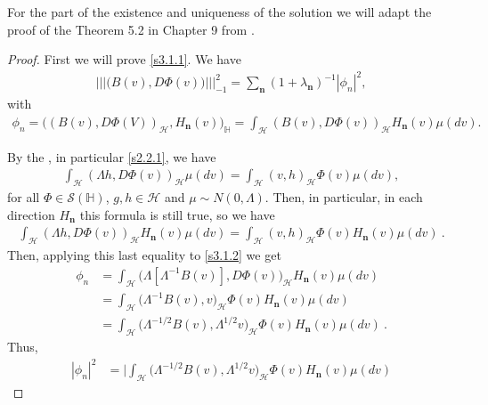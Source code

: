 \documentclass[review, onefignum, onetabnum]{siamart171218}
\begin{document}
    For the part of the existence and uniqueness of the solution we will adapt
    the proof of the Theorem 5.2 in Chapter 9 from \cite{liu}.
\begin{proof}
    First we will prove \eqref{s3.1.1}. We have
    \begin{align*}
        ||| \big(B(v),D\Phi(v) \big) |||_{-1}^2 =\sum_{\mathbf{n}}
        (1+\lambda_{\mathbf{n}})^{-1}|\phi_n|^2 ,
    \end{align*}
    with
    \begin{align}
        \phi_n=
        \Big(
            (B(v),D\Phi(V))_{\mathcal{H}}, H_{\mathbf{n}}(v)
        \Big)_{\mathbb{H}}
        =\int_{\mathcal{H}} (B(v),D\Phi(v))_{\mathcal{H}} H_{\mathbf{n}}(v)
        \mu(dv).\label{s3.1.2}
\end{align}

By the , in particular \eqref{s2.2.1}, we have
\begin{align*}
 \int_{\mathcal{H}} (\Lambda h,D\Phi(v))_{\mathcal{H}}  \mu(dv) =
\int_{\mathcal{H}} (v,h)_{\mathcal{H}} \Phi(v)  \mu(dv) ,
\end{align*}
for all $\Phi\in \mathcal{S}(\mathbb{H})$, $g,h\in \mathcal{H}$ and $\mu\sim
N(0,\Lambda)$. Then, in particular, in each direction $H_{\mathbf{n}}$
this formula is still true, so we have
\begin{align*}
 \int_{\mathcal{H}} (\Lambda h,D\Phi(v))_{\mathcal{H}} H_{\mathbf{n}}(v)
\mu(dv) =
 \int_{\mathcal{H}} (v,h)_{\mathcal{H}} \Phi(v) H_{\mathbf{n}}(v) \mu(dv) \ .
\end{align*}
Then, applying this last equality to \eqref{s3.1.2} we get
\begin{align}
 \phi_n &=\int_{\mathcal{H}}
\big(\Lambda[\Lambda^{-1}B(v)],D\Phi(v)\big)_{\mathcal{H}} H_{\mathbf{n}}(v)
\mu(dv)\nonumber\\
 &= \int_{\mathcal{H}} \big(\Lambda^{-1}B(v),v \big)_{\mathcal{H}} \Phi(v)
H_{\mathbf{n}}(v) \mu(dv)\nonumber\\
 &= \int_{\mathcal{H}} \big(\Lambda^{-1/2}B(v),\Lambda^{1/2}v
\big)_{\mathcal{H}} \Phi(v) H_{\mathbf{n}}(v) \mu(dv) \nonumber
    \ .
\end{align}
Thus,
\begin{equation}
    \label{s3.1.3}
    \begin{aligned}
        |\phi_n |^2 &=
            \Bigg|
                \int_{\mathcal{H}}
                    \big(
                        \Lambda^{-1/2}B(v),\Lambda^{1/2}v
                    \big)_{\mathcal{H}} \Phi(v)
                    H_{\mathbf{n}}(v) \mu(dv)

\end{aligned}
\end{equation}
\end{proof}
\end{document}
